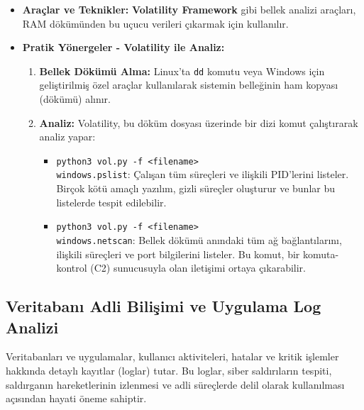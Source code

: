 \begin{itemize}
\begin{itemize}
    \item \textbf{Araçlar ve Teknikler:} \textbf{Volatility Framework} gibi bellek analizi araçları, RAM dökümünden bu uçucu verileri çıkarmak için kullanılır.
    \item \textbf{Pratik Yönergeler - Volatility ile Analiz:}
    \begin{enumerate}
        \item \textbf{Bellek Dökümü Alma:} Linux'ta \texttt{dd} komutu veya Windows için geliştirilmiş özel araçlar kullanılarak sistemin belleğinin ham kopyası (dökümü) alınır.
        \item \textbf{Analiz:} Volatility, bu döküm dosyası üzerinde bir dizi komut çalıştırarak analiz yapar:
        \begin{itemize}
            \item \texttt{python3 vol.py -f \textless{}filename\textgreater{} \\ \hspace*{1cm}windows.pslist}: Çalışan tüm süreçleri ve ilişkili PID'lerini listeler. Birçok kötü amaçlı yazılım, gizli süreçler oluşturur ve bunlar bu listelerde tespit edilebilir.
            \item \texttt{python3 vol.py -f \textless{}filename\textgreater{} \\ \hspace*{1cm}windows.netscan}: Bellek dökümü anındaki tüm ağ bağlantılarını, ilişkili süreçleri ve port bilgilerini listeler. Bu komut, bir komuta-kontrol (C2) sunucusuyla olan iletişimi ortaya çıkarabilir.
        \end{itemize}
    \end{enumerate}
\end{itemize}

\subsection{Veritabanı Adli Bilişimi ve Uygulama Log Analizi}

Veritabanları ve uygulamalar, kullanıcı aktiviteleri, hatalar ve kritik işlemler hakkında detaylı kayıtlar (loglar) tutar. Bu loglar, siber saldırıların tespiti, saldırganın hareketlerinin izlenmesi ve adli süreçlerde delil olarak kullanılması açısından hayati öneme sahiptir.


\end{itemize}
